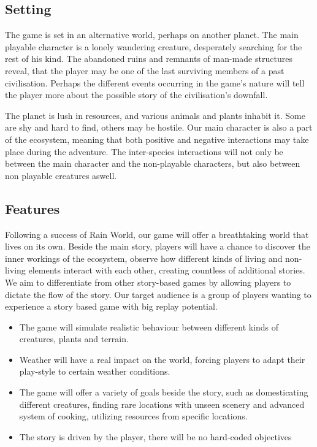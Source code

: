 \documentclass[a4paper,10pt,english]{article}
\begin{document}
\subsection*{Setting}
The game is set in an alternative world, perhaps on another planet. The main playable character is a lonely wandering creature, desperately searching for the rest of his kind. The abandoned ruins and remnants of man-made structures reveal, that the player may be one of the last surviving members of a past civilisation. Perhaps the different events occurring in the game's nature will tell the player more about the possible story of the civilisation's downfall.

The planet is lush in resources, and various animals and plants inhabit it. Some are shy and hard to find, others may be hostile. Our main character is also a part of the ecosystem, meaning that both positive and negative interactions may take place during the adventure. The inter-species interactions will not only be between the main character and the non-playable characters, but also between non playable creatures aswell.

\subsection*{Features}
Following a success of Rain World, our game will offer a breathtaking world that lives on its own. Beside the main story, players will have a chance to discover the inner workings of the ecosystem, observe how different kinds of living and non-living elements interact with each other, creating countless of additional stories. We aim to differentiate from other story-based games by allowing players to dictate the flow of the story.  Our target audience is a group of players wanting to experience a story based game with big replay potential.

\begin{itemize}
    \item The game will simulate realistic behaviour between different kinds of creatures, plants and terrain.
    \item Weather will have a real impact on the world, forcing players to adapt their play-style to certain weather conditions.
    \item The game will offer a variety of goals beside the story, such as domesticating different creatures, finding rare locations with unseen scenery and advanced system of cooking, utilizing resources from specific locations.
    \item The story is driven by the player, there will be no hard-coded objectives
\end{itemize}
\end{document}
